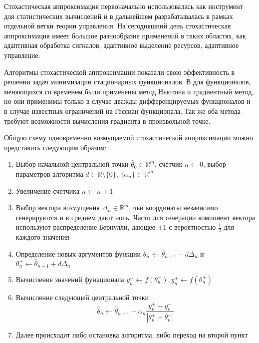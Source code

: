 Стохастическая аппроксимация первоначально использовалась как инструмент для статистических вычислений и в дальнейшем разрабатывалась в рамках отдельной ветки теории управления. На сегодняшний день стохастическая аппроксимация имеет большое разнообразие применений в таких областях, как адаптивная обработка сигналов, адаптивное выделение ресурсов, адаптивное управление.

Алгоритмы стохастической аппроксимации показали свою эффективность в решении задач минимизации стационарных функционалов. В \cite{Polyak:1987} для функционалов, меняющихся со временем были применены метод Ньютона и градиентный метод, но они применимы только в случае дважды дифференцируемых функционалов и в случае известных ограничений на Гессиан функционала. Так же оба метода требуют возможности вычисления градиента в произвольной точке.

Общую схему одновременно возмущаемой стохастической аппроксимации можно представить следующим образом:

\begin{enumerate}
	\item Выбор начальной центральной точки $\hat{\theta}_0 \in \mathbb{R}^m$, счётчик $n \leftarrow 0$, выбор параметров алгоритма $d \in \mathbb{R} \setminus \{0\}$, $\{\alpha_n\} \subset \mathbb{R}^m$
	\item Увеличение счётчика $n \leftarrow n + 1$
	\item Выбор вектора возмущения $\Delta_n \in \mathbb{R}^m$, чьи координаты независимо генерируются и в среднем дают ноль. Часто для генерации компонент вектора используют распределение Бернулли, дающее $\pm1$ с вероятностью $\frac{1}{2}$ для каждого значения
	\item Определение новых аргументов функции $\theta_{n}^{-} \leftarrow \hat{\theta}_{n - 1} - d\Delta_{n}$ и $\theta_{n}^{+} \leftarrow \hat{\theta}_{n - 1} + d\Delta_{n}$
	\item Вычисление значений функционала $y_n^{-} \leftarrow f(\theta_{n}^{-}), y_n^{+} \leftarrow f(\theta_{n}^{+})$
	\item Вычисление следующей центральной точки
	\begin{equation} \label{eq:spsa-central}
		\hat{\theta}_n \leftarrow \hat{\theta}_{n - 1} - \alpha_n \frac{y_n^{+} - y_n^{-}}{|\theta_{n}^{+} - \theta_{n}^{-}|}
	\end{equation}
	\item Далее происходит либо остановка алгоритма, либо переход на второй пункт
\end{enumerate}


